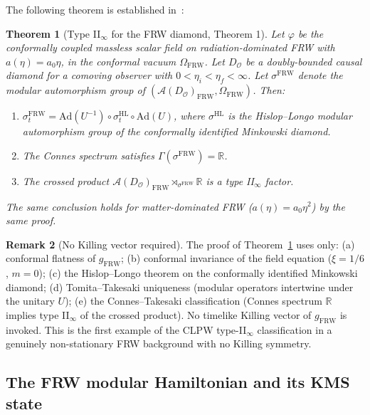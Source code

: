 \documentclass[12pt,a4paper]{article}
\newtheorem{theorem}{Theorem}
\theoremstyle{definition}
\newtheorem{remark}[theorem]{Remark}
\newcommand{\HL}{\mathrm{HL}}
\newcommand{\FRW}{\mathrm{FRW}}
\begin{document}
The following theorem is established in~\cite{FRWnote}:

\begin{theorem}[{Type II$_\infty$ for the FRW diamond, \cite{FRWnote} Theorem 1}]
\label{thm:FRW-typeII}
Let $\varphi$ be the conformally coupled massless scalar field on
radiation-dominated FRW with $a(\eta) = a_0\eta$, in the conformal
vacuum $\Omega_\FRW$.
Let $D_\mathcal{O}$ be a doubly-bounded causal diamond for a comoving
observer with $0 < \eta_i < \eta_f < \infty$.
Let $\sigma^\FRW$ denote the modular automorphism group of
$(\mathcal{A}(D_\mathcal{O})_\FRW, \Omega_\FRW)$.
Then:
\begin{enumerate}
\item[(1)] $\sigma_t^\FRW = \mathrm{Ad}(U^{-1}) \circ \sigma_t^\HL \circ \mathrm{Ad}(U)$,
  where $\sigma^\HL$ is the Hislop--Longo modular automorphism group of
  the conformally identified Minkowski diamond.
\item[(2)] The Connes spectrum satisfies $\Gamma(\sigma^\FRW) = \mathbb{R}$.
\item[(3)] The crossed product $\mathcal{A}(D_\mathcal{O})_\FRW
  \rtimes_{\sigma^\FRW} \mathbb{R}$ is a type II$_\infty$ factor.
\end{enumerate}
The same conclusion holds for matter-dominated FRW ($a(\eta) = a_0\eta^2$)
by the same proof.
\end{theorem}

\begin{remark}[No Killing vector required]
The proof of Theorem~\ref{thm:FRW-typeII} uses only:
(a) conformal flatness of $g_\FRW$;
(b) conformal invariance of the field equation ($\xi = 1/6$, $m = 0$);
(c) the Hislop--Longo theorem on the conformally identified Minkowski diamond;
(d) Tomita--Takesaki uniqueness (modular operators intertwine under
the unitary $U$);
(e) the Connes--Takesaki classification (Connes spectrum $\mathbb{R}$
implies type II$_\infty$ of the crossed product).
No timelike Killing vector of $g_\FRW$ is invoked.
This is the first example of the CLPW type-II$_\infty$ classification
in a genuinely non-stationary FRW background with no Killing symmetry.
\end{remark}

\subsection{The FRW modular Hamiltonian and its KMS state}
\end{document}
